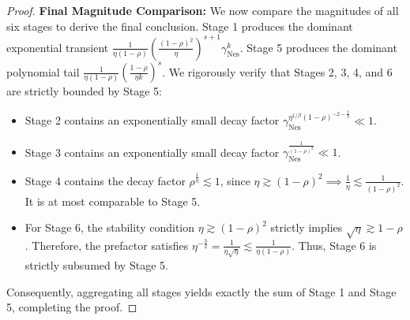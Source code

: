 \begin{proof}
\textbf{Final Magnitude Comparison:}
We now compare the magnitudes of all six stages to derive the final conclusion.
Stage 1 produces the dominant exponential transient $\frac{1}{\eta(1-\rho)} \left(\frac{(1-\rho)^2}{\eta}\right)^{s+1} \gamma_{\mathrm{Nes}}^k$. 
Stage 5 produces the dominant polynomial tail $\frac{1}{\eta(1-\rho)} \left(\frac{1-\rho}{\eta k}\right)^s$.
We rigorously verify that Stages 2, 3, 4, and 6 are strictly bounded by Stage 5:
\begin{itemize}
    \item Stage 2 contains an exponentially small decay factor $\gamma_{\mathrm{Nes}}^{\eta^{1/\beta}(1-\rho)^{-2-\frac{2}{\beta}}} \ll 1$.
    \item Stage 3 contains an exponentially small decay factor $\gamma_{\mathrm{Nes}}^{\frac{1}{(1-\rho)^2}} \ll 1$.
    \item Stage 4 contains the decay factor $\rho^{\frac{1}{\eta}} \lesssim 1$, since $\eta \gtrsim (1-\rho)^2 \implies \frac{1}{\eta} \lesssim \frac{1}{(1-\rho)^2}$. It is at most comparable to Stage 5.
    \item For Stage 6, the stability condition $\eta \gtrsim (1-\rho)^2$ strictly implies $\sqrt{\eta} \gtrsim 1-\rho$. Therefore, the prefactor satisfies $\eta^{-\frac{3}{2}} = \frac{1}{\eta\sqrt{\eta}} \lesssim \frac{1}{\eta(1-\rho)}$. Thus, Stage 6 is strictly subsumed by Stage 5.
\end{itemize}
Consequently, aggregating all stages yields exactly the sum of Stage 1 and Stage 5, completing the proof.
\end{proof}


